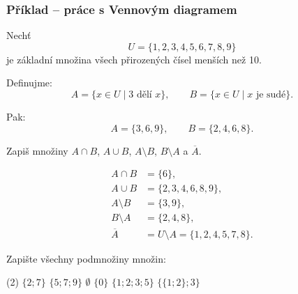 \documentclass[12pt,a4paper]{article}
\begin{document}
\subsubsection*{Příklad – práce s Vennovým diagramem}
\begin{examplebox}
Nechť \[U = \{1,2,3,4,5,6,7,8,9\}\] je základní množina všech přirozených čísel menších než 10.  

Definujme:  
\[
A = \{x \in U \mid 3 \text{ dělí } x\}, \qquad
B = \{x \in U \mid x \text{ je sudé}\}.
\]

Pak:
\[
A = \{3,6,9\}, \qquad
B = \{2,4,6,8\}.
\]


Zapiš množiny $A \cap B$, $A \cup B$, $A \setminus B$, $B \setminus A$ a $\overline{A}$.
\end{examplebox}

\begin{solutionbox}
\begin{align*}
A \cap B &= \{6\}, \\
A \cup B &= \{2,3,4,6,8,9\}, \\
A \setminus B &= \{3,9\}, \\
B \setminus A &= \{2,4,8\}, \\
\overline{A} &= U \setminus A = \{1,2,4,5,7,8\}.
\end{align*}


\begin{center}
\end{center}
\end{solutionbox}




\exercisepart


\begin{exercise}
Zapište všechny podmnožiny množin:
\begin{tasks}(2)
    \task $\{2;7\}$
    \task $\{5;7;9\}$
    \task $\emptyset$
    \task $\{0\}$
    \task $\{1;2;3;5\}$
    \task $\{\{1;2\}; 3 \}$
\end{tasks}
\end{exercise}
\end{document}
